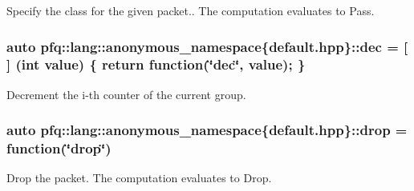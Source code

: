 Specify the class for the given packet.. The computation evaluates to {\ttfamily Pass}. 

\subsubsection[{\texorpdfstring{dec}{dec}}]{\setlength{\rightskip}{0pt plus 5cm}auto pfq\+::lang\+::anonymous\+\_\+namespace\{default.\+hpp\}\+::dec = \mbox{[}$\,$\mbox{]} (int value) \{ return {\bf function}(\char`\"{}dec\char`\"{}, value); \}}\hypertarget{namespacepfq_1_1lang_1_1anonymous__namespace_02default_8hpp_03_a139906841e77a2eb86b761b27ceeb685}{}\label{namespacepfq_1_1lang_1_1anonymous__namespace_02default_8hpp_03_a139906841e77a2eb86b761b27ceeb685}


Decrement the i-\/th counter of the current group. 

\subsubsection[{\texorpdfstring{drop}{drop}}]{\setlength{\rightskip}{0pt plus 5cm}auto pfq\+::lang\+::anonymous\+\_\+namespace\{default.\+hpp\}\+::drop = {\bf function}(\char`\"{}drop\char`\"{})}\hypertarget{namespacepfq_1_1lang_1_1anonymous__namespace_02default_8hpp_03_a0d715988e000ac6284a1615091eb4067}{}\label{namespacepfq_1_1lang_1_1anonymous__namespace_02default_8hpp_03_a0d715988e000ac6284a1615091eb4067}


Drop the packet. The computation evaluates to {\ttfamily Drop}. 

